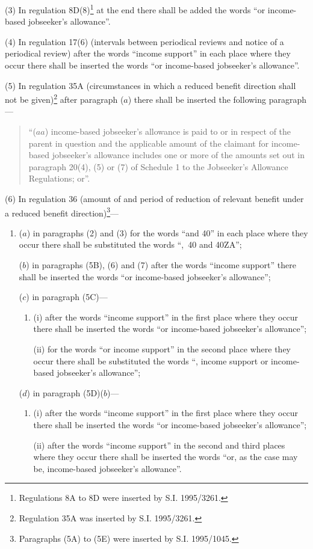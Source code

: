 \documentclass[a4paper]{article}
\begin{document}
(3) In regulation 8D(8)\footnote{\frenchspacing Regulations 8A to 8D were inserted by S.I. 1995/3261.} at the end there shall be added the words “or income-based jobseeker’s allowance”.

(4) In regulation 17(6) (intervals between periodical reviews and notice of a periodical review) after the words “income support” in each place where they occur there shall be inserted the words “or income-based jobseeker’s allowance”.

(5) In regulation 35A (circumstances in which a reduced benefit direction shall not be given)\footnote{\frenchspacing Regulation 35A was inserted by S.I. 1995/3261.} after paragraph ($a$) there shall be inserted the following paragraph—
\begin{quotation}
“($aa$) income-based jobseeker’s allowance is paid to or in respect of the parent in question and the applicable amount of the claimant for income-based jobseeker’s allowance includes one or more of the amounts set out in paragraph 20(4), (5) or (7) of Schedule 1 to the Jobseeker’s Allowance Regulations; or”.
\end{quotation}

(6) In regulation 36 (amount of and period of reduction of relevant benefit under a reduced benefit direction)\footnote{\frenchspacing Paragraphs (5A) to (5E) were inserted by S.I. 1995/1045.}—
\begin{enumerate}\item[]
($a$) in paragraphs (2) and (3) for the words “and 40” in each place where they occur there shall be substituted the words “,~40 and 40ZA”;

($b$) in paragraphs (5B), (6) and (7) after the words “income support” there shall be inserted the words “or income-based jobseeker’s allowance”;

($c$) in paragraph (5C)—
\begin{enumerate}\item[]
(i) after the words “income support” in the first place where they occur there shall be inserted the words “or income-based jobseeker’s allowance”;

(ii) for the words “or income support” in the second place where they occur there shall be substituted the words “, income support or income-based jobseeker’s allowance”;
\end{enumerate}

($d$) in paragraph (5D)($b$)—
\begin{enumerate}\item[]
(i) after the words “income support” in the first place where they occur there shall be inserted the words “or income-based jobseeker’s allowance”;

(ii) after the words “income support” in the second and third places where they occur there shall be inserted the words “or, as the case may be, income-based jobseeker’s allowance”.
\end{enumerate}
\end{enumerate}
\end{document}
